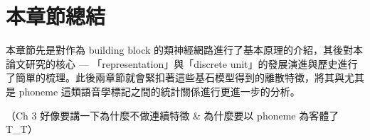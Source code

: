 \section{本章節總結}

本章節先是對作為 building block 的類神經網路進行了基本原理的介紹，其後對本論文研究的核心 --- 「representation」與「discrete unit」的發展演進與歷史進行了簡單的梳理。此後兩章節就會緊扣著這些基石模型得到的離散特徵，將其與尤其是 phoneme 這類語音學標記之間的統計關係進行更進一步的分析。

（Ch 3 好像要講一下為什麼不做連續特徵 \& 為什麼要以 phoneme 為客體了 T\_T）


 